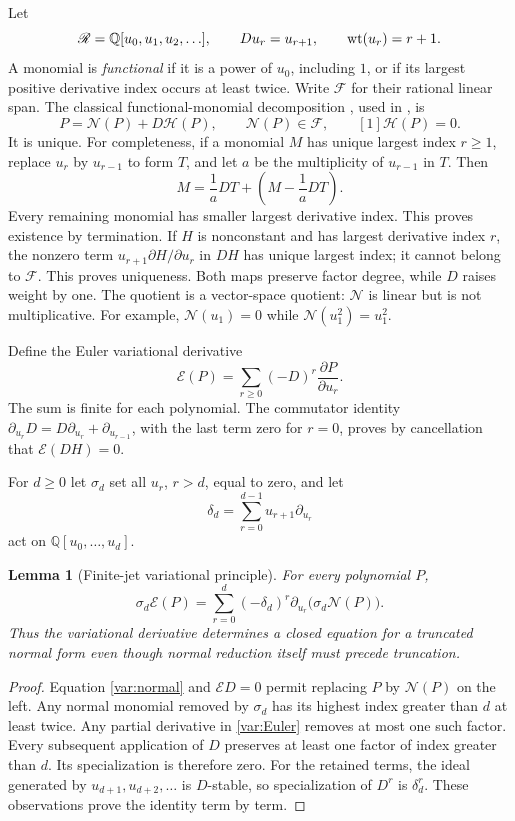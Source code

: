 \documentclass[11pt,letterpaper]{article}
\numberwithin{equation}{section}
\theoremstyle{plain}
\newtheorem{lemma}[theorem]{Lemma}
\theoremstyle{definition}
\theoremstyle{remark}
\newcommand{\Q}{\mathbb Q}\newcommand{\R}{\mathbb R}\newcommand{\C}{\mathbb C}
\newcommand{\NN}{\mathcal N}\newcommand{\HH}{\mathcal H}
\begin{document}
Let
\[
 \mathscr R=\Q[u_0,u_1,u_2,\ldots],\qquad
 Du_r=u_{r+1},\qquad \wt(u_r)=r+1.
\]
A monomial is \emph{functional} if it is a power of $u_0$, including
$1$, or if its largest positive derivative index occurs at least twice.
Write $\mathscr F$ for their rational linear span.
The classical functional-monomial decomposition
\cite[Proposition 4.10]{Guo2014}, used in \cite{DPL,PTI}, is
\begin{equation}\label{var:normal}
 P=\NN(P)+D\HH(P),\qquad \NN(P)\in\mathscr F,
 \qquad [1]\HH(P)=0.
\end{equation}
It is unique. For completeness, if a monomial $M$ has unique largest
index $r\ge1$, replace $u_r$ by $u_{r-1}$ to form $T$, and let $a$
be the multiplicity of $u_{r-1}$ in $T$. Then
\[
 M=\frac1aDT+\left(M-\frac1aDT\right).
\]
Every remaining monomial has smaller largest derivative index.
This proves existence by termination. If $H$ is nonconstant and has
largest derivative index $r$, the nonzero term
$u_{r+1}\partial H/\partial u_r$ in $DH$ has unique largest index;
it cannot belong to $\mathscr F$. This proves uniqueness. Both maps
preserve factor degree, while $D$ raises weight by one. The quotient
is a vector-space quotient: $\NN$ is linear but is not multiplicative.
For example, $\NN(u_1)=0$ while $\NN(u_1^2)=u_1^2$.

Define the Euler variational derivative
\begin{equation}\label{var:Euler}
 \mathscr E(P)=\sum_{r\ge0}(-D)^r\frac{\partial P}{\partial u_r}.
\end{equation}
The sum is finite for each polynomial. The commutator identity
$\partial_{u_r}D=D\partial_{u_r}+\partial_{u_{r-1}}$, with the
last term zero for $r=0$, proves by cancellation that
$\mathscr E(DH)=0$.

For $d\ge0$ let $\sigma_d$ set all $u_r$, $r>d$, equal to zero,
and let
\[
 \delta_d=\sum_{r=0}^{d-1}u_{r+1}\partial_{u_r}
\]
act on $\Q[u_0,\ldots,u_d]$.

\begin{lemma}[Finite-jet variational principle]\label{var:finitejet}
For every polynomial $P$,
\begin{equation}\label{var:finitejet-eq}
 \sigma_d\mathscr E(P)=
 \sum_{r=0}^d(-\delta_d)^r
      \partial_{u_r}\bigl(\sigma_d\NN(P)\bigr).
\end{equation}
Thus the variational derivative determines a closed equation for a
truncated normal form even though normal reduction itself must precede
truncation.
\end{lemma}
\begin{proof}
Equation \eqref{var:normal} and $\mathscr E D=0$ permit replacing
$P$ by $\NN(P)$ on the left. Any normal monomial removed by
$\sigma_d$ has its highest index greater than $d$ at least twice.
Any partial derivative in \eqref{var:Euler} removes at most one such
factor. Every subsequent application of $D$ preserves at least one
factor of index greater than $d$. Its specialization is therefore zero.
For the retained terms, the ideal generated by $u_{d+1},u_{d+2},\ldots$
is $D$-stable, so specialization of $D^r$ is $\delta_d^r$.
These observations prove the identity term by term.
\end{proof}
\end{document}
